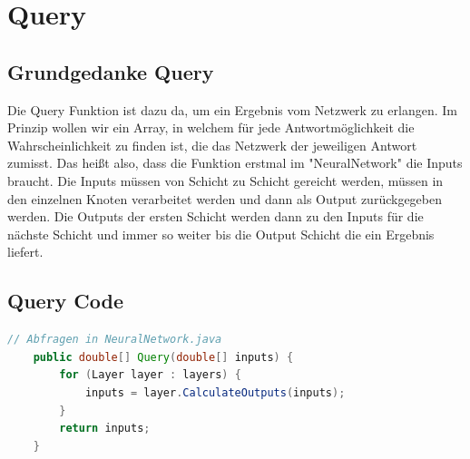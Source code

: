 \documentclass[12pt]{article}
\begin{document}
\section{Query}\subsection{Grundgedanke Query}Die Query Funktion ist dazu da, um ein Ergebnis vom Netzwerk zu erlangen. Im Prinzip wollen wir ein Array, in welchem für jede Antwortmöglichkeit die Wahrscheinlichkeit zu finden ist, die das Netzwerk der jeweiligen Antwort zumisst. 
Das heißt also, dass die Funktion erstmal im "NeuralNetwork" die Inputs braucht. Die Inputs müssen von Schicht zu Schicht gereicht werden, müssen in den einzelnen Knoten verarbeitet werden und dann als Output zurückgegeben werden. Die Outputs der ersten Schicht werden dann zu den Inputs für die nächste Schicht und immer so weiter bis die Output Schicht die ein Ergebnis liefert.\subsection{Query Code}\begin{lstlisting}[language=Java]
// Abfragen in NeuralNetwork.java
    public double[] Query(double[] inputs) {
        for (Layer layer : layers) {
            inputs = layer.CalculateOutputs(inputs);
        }
        return inputs;
    }
\end{lstlisting}
\end{document}
